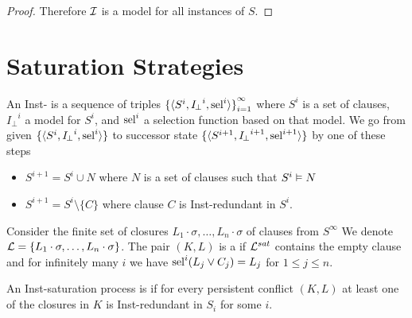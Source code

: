 \begin{proof}
        Therefore \( \mathcal{I} \) is a model for all instances of \( S \).
   \end{proof}

   \section{Saturation Strategies}



   \begin{definition}
    An Inst- is a sequence of triples
    \(
        {\{
            \langle
            S^i, {I\!_\bot}^i, \operatorname{sel}^i
            \rangle
            \}}_{i=1}^\infty
    \)
    where \( S^i \) is a set of clauses,
    \( {I\!_\bot}^i \) a model for \( S^i \),
    and \( \operatorname{sel}^i \) a selection function based on that model.
%
    We go from given
    \( {\{ \langle S^i, {I\!_\bot}^i, \operatorname{sel}^i \rangle \}} \)
    to successor state
    \( {\{ \langle S^{i+1}, {I\!_\bot}^{i+1}, \operatorname{sel}^{i+1} \rangle \}} \)
    by one of these steps
    \begin{itemize}
        \item
        \( S^{i+1} = S^i \cup N \)
        where \( N \) is a set of clauses such that
        \( S^i \vDash N \)
        \item
        \( S^{i+1} = S^i \setminus \{ C \} \)
        where clause \( C \) is Inst-redundant in \( S^i \).
    \end{itemize}
\end{definition}

    Consider the finite set of closures
    \( L_1\cdot\sigma, \ldots, L_n\cdot\sigma \)
    of clauses from \( S^\infty \)
    We denote \( \mathcal{L} = \{ L_1\cdot\sigma, \ldots, L_n\cdot\sigma \} \).
    The pair \( (K,L) \) is a  if
    \( \mathcal{L}^{sat} \) contains the empty clause
    and for infinitely many \( i \)
    we have \( \operatorname{sel}^i(L_j\lor C_j) = L_j \)
    for \( 1\leq j\leq n\).


    \begin{definition}
    An Inst-saturation process is 
    if for every persistent conflict
    \( (K,L) \)
    at least one of the closures in \( K \)
    is Inst-redundant in \( S_i \) for some \( i \).
    \end{definition}












